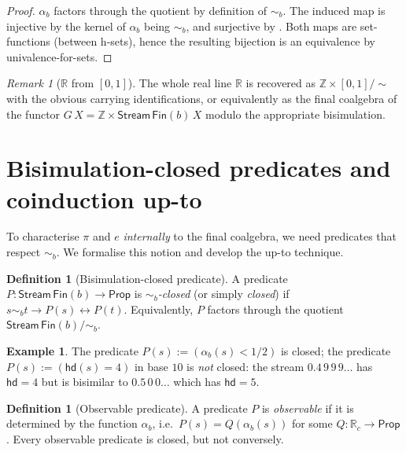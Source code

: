 \documentclass[12pt]{article}
\theoremstyle{definition}
\newtheorem{definition}[theorem]{Definition}
\newtheorem{example}[theorem]{Example}
\theoremstyle{remark}
\newtheorem{remark}[theorem]{Remark}
\newcommand{\Z}{\mathbb{Z}}
\newcommand{\R}{\mathbb{R}}
\newcommand{\Rc}{\R_c}
\newcommand{\Stream}{\mathsf{Stream}}
\newcommand{\hd}{\mathsf{hd}}
\newcommand{\bisim}{\mathrel{\sim}}
\begin{document}
\begin{proof}
$\alpha_b$ factors through the quotient by definition of $\bisim_b$.
The induced map is injective by the kernel of $\alpha_b$ being
$\bisim_b$, and surjective by . Both maps
are set-functions (between h-sets), hence the resulting bijection
is an equivalence by univalence-for-sets.
\end{proof}

\begin{remark}[$\R$ from ${[0,1]}$]
The whole real line $\R$ is recovered as
$\Z \times [0,1] / \sim$ with the obvious carrying identifications,
or equivalently as the final coalgebra of the functor
$G\,X = \Z \times \Stream\,\mathsf{Fin}(b)\,X$ modulo
the appropriate bisimulation.
\end{remark}

\section{Bisimulation-closed predicates and coinduction up-to}\label{sec:bisim}

To characterise $\pi$ and $e$ \emph{internally} to the final
coalgebra, we need predicates that respect $\bisim_b$. We
formalise this notion and develop the up-to technique.

\begin{definition}[Bisimulation-closed predicate]\label{def:bclosed}
A predicate $P: \Stream\,\mathsf{Fin}(b) \to \mathsf{Prop}$ is
\emph{$\bisim_b$-closed} (or simply \emph{closed}) if
$s \bisim_b t \to P(s) \leftrightarrow P(t)$. Equivalently, $P$
factors through the quotient $\Stream\,\mathsf{Fin}(b)/{\bisim_b}$.
\end{definition}

\begin{example}\label{ex:closed}
The predicate $P(s) := (\alpha_b(s) < 1/2)$ is closed; the
predicate $P(s) := (\hd(s) = 4)$ in base $10$ is \emph{not}
closed: the stream $0.4\,9\,9\,9\dots$ has $\hd = 4$ but is
bisimilar to $0.5\,0\,0\dots$ which has $\hd = 5$.
\end{example}

\begin{definition}[Observable predicate]\label{def:observable}
A predicate $P$ is \emph{observable} if it is determined by the
function $\alpha_b$, i.e.\ $P(s) = Q(\alpha_b(s))$ for some
$Q: \Rc \to \mathsf{Prop}$. Every observable predicate is closed,
but not conversely.
\end{definition}
\end{document}
